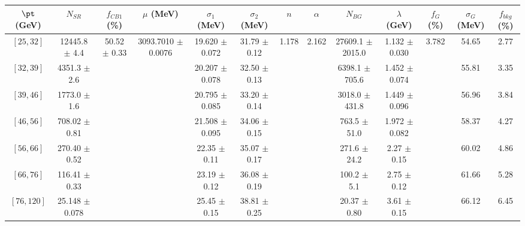 \begin{tabular}{c||c|c|c|c|c|c|c|c|c|c|c||c}
$\pt$ (GeV) & $N_{SR}$ & $f_{CB1}$ (\%) & $\mu$ (MeV) & $\sigma_1$ (MeV) & $\sigma_2$ (MeV) & $n$ & $\alpha$ & $N_{BG}$ & $\lambda$ (GeV) & $f_G$ (\%) & $\sigma_G$ (MeV) & $f_{bkg}$ (\%) \\
\hline
$[25, 32]$ & 12445.8 $\pm$ 4.4 & \multirow{7}{*}{50.52 $\pm$ 0.33} & \multirow{7}{*}{3093.7010 $\pm$ 0.0076} & 19.620 $\pm$ 0.072 & 31.79 $\pm$ 0.12 & \multirow{7}{*}{1.178} & \multirow{7}{*}{2.162} & 27609.1 $\pm$ 2015.0 & 1.132 $\pm$ 0.030 & \multirow{7}{*}{3.782} & 54.65 & 2.77\\
$[32, 39]$ & 4351.3 $\pm$ 2.6 &  &  & 20.207 $\pm$ 0.078 & 32.50 $\pm$ 0.13 &  &  & 6398.1 $\pm$ 705.6 & 1.452 $\pm$ 0.074 &  & 55.81 & 3.35\\
$[39, 46]$ & 1773.0 $\pm$ 1.6 &  &  & 20.795 $\pm$ 0.085 & 33.20 $\pm$ 0.14 &  &  & 3018.0 $\pm$ 431.8 & 1.449 $\pm$ 0.096 &  & 56.96 & 3.84\\
$[46, 56]$ & 708.02 $\pm$ 0.81 &  &  & 21.508 $\pm$ 0.095 & 34.06 $\pm$ 0.15 &  &  & 763.5 $\pm$ 51.0 & 1.972 $\pm$ 0.082 &  & 58.37 & 4.27\\
$[56, 66]$ & 270.40 $\pm$ 0.52 &  &  & 22.35 $\pm$ 0.11 & 35.07 $\pm$ 0.17 &  &  & 271.6 $\pm$ 24.2 & 2.27 $\pm$ 0.15 &  & 60.02 & 4.86\\
$[66, 76]$ & 116.41 $\pm$ 0.33 &  &  & 23.19 $\pm$ 0.12 & 36.08 $\pm$ 0.19 &  &  & 100.2 $\pm$ 5.1 & 2.75 $\pm$ 0.12 &  & 61.66 & 5.28\\
$[76, 120]$ & 25.148 $\pm$ 0.078 &  &  & 25.45 $\pm$ 0.15 & 38.81 $\pm$ 0.25 &  &  & 20.37 $\pm$ 0.80 & 3.61 $\pm$ 0.15 &  & 66.12 & 6.45\\
\end{tabular}

